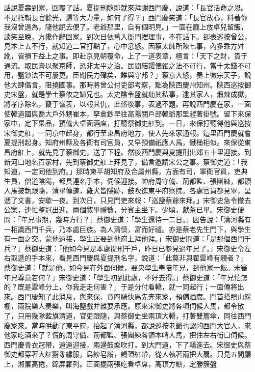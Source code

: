 \begin{showcontents}{}
話說夏壽到家，回覆了話。夏提刑隨即就來拜謝西門慶，說道：「長官活命之恩。不是托賴長官餘光，這等大力量，如何了得？」西門慶笑道：「長官放心，料著你我沒曾過為，隨他說去便了。老爺那里，自有個明見。」一面在廳上放卓兒留飯，談笑至晚，方纔作辭回家。到次日依舊入衙門裡理事，不在話下。卻表巡按曾公，見本上去不行，就知道二官打點了，心中忿怒。因蔡太師所陳七事，內多乖方舛訛，皆損下益上之事。即赴京見朝覆命，上了一道表章，極言：「天下之財，貴于通流。取民膏以聚京師，恐非太平之治。民間結糶俵糴之法不可行，當十太錢不可用，鹽鈔法不可屢更。臣聞民力殫矣，誰與守邦？」蔡京大怒，奏上徽宗天子，說他大肆倡言，阻撓國事。那時將曾公付吏部考察，黜為陝西慶州知州。陝西巡按御史宋盤，就是學士蔡攸之婦兄也。太史陰令盤就劾其私事，逮其家人，煆煉成獄，將孝序除名，竄于嶺表，以報其仇，此係後事，表過不題。再說西門慶在家，一面使韓道國與喬大戶外甥崔本，拏倉鈔早往高陽關戶部韓爺那里趕著掛號。留下來保家中，定下果品，預備大卓面酒席，打聽祭御史舡到。一日，來保打聽得他與巡按宋御史舡，一同京中起身，都行至東昌府地方，使人先來家通報。這里西門慶就會夏提刑起身。知府州縣及各衛有司官員，又早預備祇應人馬，鐵桶相似。來保從東昌府舡上，就先見了蔡御史，送了下程。然後西門慶與夏提刑出郊五十里迎接。到新河口地名百家村，先到蔡御史舡上拜見了，備言邀請宋公之事。蔡御史道：「我知道，一定同他到府。」那時東平胡知府及合屬州縣，方面有司，軍衛官員，吏典生員，僧道陰陽，都具連名手本，伺候迎接。帥府周守備、荊都監、張團練，都領人馬披執跟隨，清畢傳道，雞犬皆隱跡，鼓吹進東平府察院。各處官員都見畢，呈遞了文書，安歇一夜。到次日，只見門吏來報：「巡鹽蔡爺來拜。」宋御史急令撤去公案，連忙整冠出迎。兩個敘畢禮數，分賓主坐下。少頃，獻茶已畢。宋御史便問：「年兄事期，幾時方行？」蔡御史道：「學生還待一二日。」因告說：「清河縣有一相識西門千兵，乃本處巨族。為人清慎，富而好禮。亦是蔡老先生門下，與學生有一面之交。蒙他遠接，學生正要到他府上拜他拜。」宋御史問道：「是那個西門千兵？」蔡御史道：「他如今見是本處提刑千戶，昨日已參見過年兄了。」宋御史令左右取遞的手本來，看見西門慶與夏提刑名字，說道：「此莫非與翟雲峰有親者？」蔡御史道：「就是他。如今見在外面伺候，要央學生奉陪年兄，到他家一飯。未審年兄尊意若何？」宋御史道：「學生初到此處，不好去得。」蔡御史道：「年兄怕怎的？既是雲峰分上，你我走走何害？」于是分付看轎，就一同起行；一面傳將出來。西門慶知了此消息，與來保、賁四騎快馬先奔來家，預備酒席。門首搭照山綵棚，兩院樂人奏樂，叫海鹽戲并雜耍承應。原來宋御史將各項伺候人馬，都令散了，只用幾隊藍旗清道，官吏跟隨，與蔡御史坐兩頂大轎，打著雙簷傘，同往西門慶家來。當時哄動了東平府，抬起了清河縣，都說巡按老爺也認的西門大官人，來他家吃酒來了？慌的周守備、荊都監、張團練各領本哨人馬，把住左右街口伺候。西門慶青衣冠帶，遠遠迎接，兩邊鼓樂吹打。到大門道，下了轎進去。宋御史與蔡御史都穿著大紅獬豸繡服，烏紗皂履，鶴頂紅帶，從人執著兩把大扇。只見五間廳上，湘簾高捲，錦屏羅列。正面擺兩張吃看卓席，高頂方糖，定勝簇盤 
\end{showcontents}
